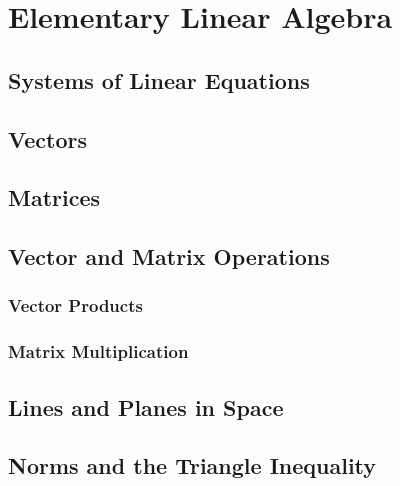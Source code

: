 \chapter{Elementary Linear Algebra}\label{chap:elementary linear algebra}

\section{Systems of Linear Equations}

\section{Vectors}

\section{Matrices}

\section{Vector and Matrix Operations}
\subsection{Vector Products}
\subsection{Matrix Multiplication}

\section{Lines and Planes in Space}

\section{Norms and the Triangle Inequality}

